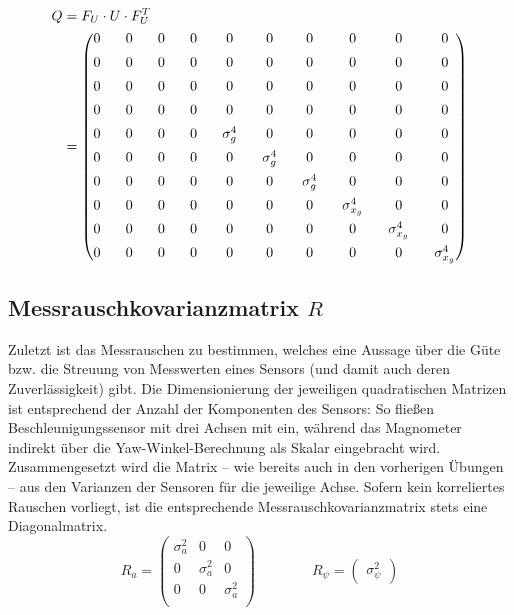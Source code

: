 \documentclass[12pt,a4paper]{article}
\begin{document}
		\begin{equation}
			\begin{split}
					Q&=F_{U}\cdot U\cdot F_{U}^{T}\\
					&=
					\setlength{\arraycolsep}{9pt}
					\begin{pmatrix}
					0 & 0 & 0 & 0 & 0 & 0 & 0 & 0 & 0 & 0 \\[0.5em]
					0 & 0 & 0 & 0 & 0 & 0 & 0 & 0 & 0 & 0 \\[0.5em]
					0 & 0 & 0 & 0 & 0 & 0 & 0 & 0 & 0 & 0 \\[0.5em]
					0 & 0 & 0 & 0 & 0 & 0 & 0 & 0 & 0 & 0 \\[0.5em]
					0 & 0 & 0 & 0 & \sigma_{g}^{4} & 0 & 0 & 0 & 0 & 0 \\[0.5em]
					0 & 0 & 0 & 0 & 0 & \sigma_{g}^{4} & 0 & 0 & 0 & 0 \\[0.5em]
					0 & 0 & 0 & 0 &0  & 0 & \sigma_{g}^{4} & 0 & 0 & 0 \\[0.5em]
					0 & 0 & 0 & 0 & 0 & 0 & 0 & \sigma_{x_{g}}^{4} & 0 & 0 \\[0.5em]
					0 & 0 & 0 & 0 & 0 & 0 & 0 & 0 & \sigma_{x_{g}}^{4} & 0 \\[0.5em]
					0 & 0 & 0 & 0 & 0 & 0 & 0 & 0 & 0 & \sigma_{x_{g}}^{4}
				\end{pmatrix}
			\end{split}
		\end{equation}
		\subsection{Messrauschkovarianzmatrix $R$}
		Zuletzt ist das Messrauschen zu bestimmen, welches eine Aussage über die Güte bzw. die Streuung von Messwerten eines Sensors (und damit auch deren Zuverlässigkeit) gibt. Die Dimensionierung der jeweiligen quadratischen Matrizen ist entsprechend der Anzahl der Komponenten des Sensors: So fließen Beschleunigungssensor mit drei Achsen mit ein, während das Magnometer indirekt über die Yaw-Winkel-Berechnung als Skalar eingebracht wird.\\
		Zusammengesetzt wird die Matrix -- wie bereits auch in den vorherigen Übungen -- aus den Varianzen der Sensoren für die jeweilige Achse. Sofern kein korreliertes Rauschen vorliegt, ist die entsprechende Messrauschkovarianzmatrix stets eine Diagonalmatrix.  
		\begin{equation}
			R_{a}=
			\begin{pmatrix}
			\sigma_{a}^{2} & 0 & 0 \\[0.5em]
			0 & \sigma_{a}^{2} & 0 \\[0.5em]
			0 & 0 & \sigma_{a}^{2}\\
			\end{pmatrix}\qquad\qquad
			R_{\psi}=
			\begin{pmatrix}
			\sigma_{\psi}^{2}
			\end{pmatrix}
		\end{equation}
\end{document}
